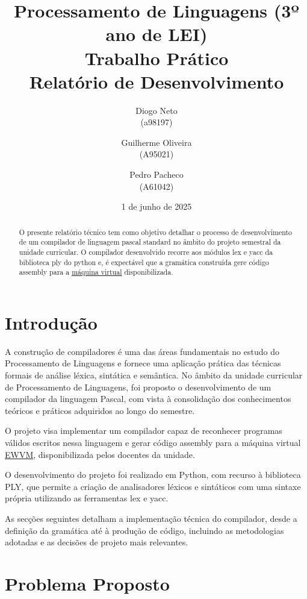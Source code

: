 \documentclass[12pt,a4paper]{report}%
\title{Processamento de Linguagens (3º ano de LEI)\\
       \textbf{Trabalho Prático}\\ Relatório de Desenvolvimento
       } %
\author{Diogo Neto\\ (a98197) \and Guilherme Oliveira\\ (A95021)
         \and Pedro Pacheco\\ (A61042)
       } %
\date{1 de junho de 2025} %
\begin{document}
\maketitle %

\begin{abstract}  %
O presente relatório técnico tem como objetivo detalhar o processo de desenvolvimento de um compilador de linguagem pascal standard no âmbito do projeto semestral da unidade curricular.
O compilador desenvolvido recorre aos módulos lex e yacc da biblioteca ply do python e, é expectável que a gramática construída gere código assembly para a  \href{https://ewvm.epl.di.uminho.pt}{máquina virtual} disponibilizada.
\end{abstract}

\tableofcontents %

\chapter{Introdução} \label{chap:intro} %

A construção de compiladores é uma das áreas fundamentais no estudo do Processamento de Linguagens e fornece uma aplicação prática das técnicas formais de análise léxica, sintática e semântica. 
No âmbito da unidade curricular de Processamento de Linguagens, foi proposto o desenvolvimento de um compilador da linguagem Pascal, com vista à consolidação dos conhecimentos teóricos e práticos adquiridos ao longo do semestre.

O projeto visa implementar um compilador capaz de reconhecer programas válidos escritos nessa linguagem e gerar código assembly para a máquina virtual \href{https://ewvm.epl.di.uminho.pt}{EWVM}, disponibilizada pelos docentes da unidade.

O desenvolvimento do projeto foi realizado em Python, com recurso à biblioteca PLY, que permite a criação de analisadores léxicos e sintáticos com uma sintaxe própria utilizando as ferramentas lex e yacc. 

As secções seguintes detalham a implementação técnica do compilador, desde a definição da gramática até à produção de código, incluindo as metodologias adotadas e as decisões de projeto mais relevantes.



\chapter{Problema Proposto}
\end{document}
